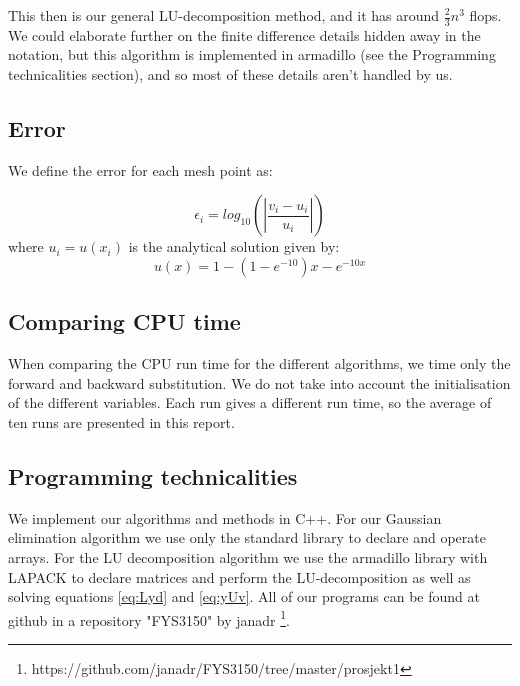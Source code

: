 This then is our general LU-decomposition method, and it has around
$\frac{2}{3}n^3$ flops. We could elaborate further on the finite difference
details hidden away in the notation, but this algorithm is implemented in
armadillo (see the Programming technicalities section), and so most of these details
aren't handled by us.

\subsection{Error}
\label{sec:error}

We define the error for each mesh point as:

	\begin{equation}
	\epsilon_i=log_{10}\left(\left|\frac{v_i-u_i}{u_i}\right|\right)
	\end{equation}
where $u_i=u(x_i)$ is the analytical solution given by:
\begin{equation}
u(x) = 1-(1-e^{-10})x-e^{-10x}
\end{equation}

\subsection{Comparing CPU time}
When comparing the CPU run time for the different algorithms, we time only the forward and backward substitution. We do not take into account the initialisation of the different variables. Each run gives a different run time, so the average of ten runs are presented in this report.

\subsection{Programming technicalities}
\label{sec:proglang}

We implement our algorithms and methods in C++. For our Gaussian elimination
algorithm we use only the standard library to declare and operate arrays.
For the LU decomposition algorithm we use the armadillo library with LAPACK to
declare matrices and perform the LU-decomposition as well as solving equations
\ref{eq:Lyd} and \ref{eq:yUv}. All of our programs can be found at github in a
repository "FYS3150" by janadr \footnote{https://github.com/janadr/FYS3150/tree/master/prosjekt1}.
